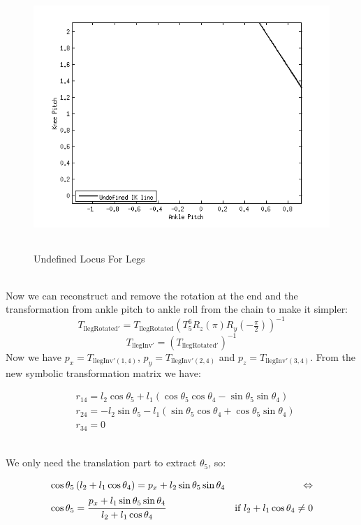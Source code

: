 \begin{figure}[!h]
	\begin{center}
		\includegraphics[height = 10cm]{Figures/locus.png}
 		\caption{Undefined Locus For Legs}
 		\label{fig:unlocus}
	\end{center}
\end{figure}\\
Now we can reconstruct and remove the rotation at the end and the transformation from ankle pitch to ankle roll from the chain to make it simpler:
\[
T_{\text{llegRotated}'} = T_\text{llegRotated}\left(T^6_5R_z\left(\pi\right)R_y(-\tfrac{\pi}{2})\right)^{-1}
\]
\[
T_{\text{llegInv}'} = \left( T_{\text{llegRotated}'} \right) ^{-1}
\]
Now we have $p_x = T_{\text{llegInv}'(1,4)}$, $p_y = T_{\text{llegInv}'(2,4)}$ and $p_z = T_{\text{llegInv}'(3,4)}$. From the new symbolic transformation matrix we have:
\begin{small}
\begin{align*}
&r_{14} = l_2\cos\theta_5 + l_1\left(\cos\theta_5\cos\theta_4 - \sin\theta_5\sin\theta_4\right)\\
&r_{24} = -l_2\sin\theta_5 - l_1\left(\sin\theta_5\cos\theta_4 + \cos\theta_5\sin\theta_4\right)\\
&r_{34} = 0
\end{align*}
\end{small}\\
We only need the translation part to extract $\theta_5$, so:
\begin{small}
\begin{align*}
&\cos\theta_5\left(l_2+l_1\cos\theta_4\right) = p_x + l_2\sin\theta_5\sin\theta_4 & \Leftrightarrow\\
&\cos\theta_5 = \cfrac{p_x + l_1\sin\theta_5\sin\theta_4}{l_2+l_1\cos\theta_4}&\text{if }l_2+l_1\cos\theta_4\neq0\\
\end{align*}
\end{small}\\
